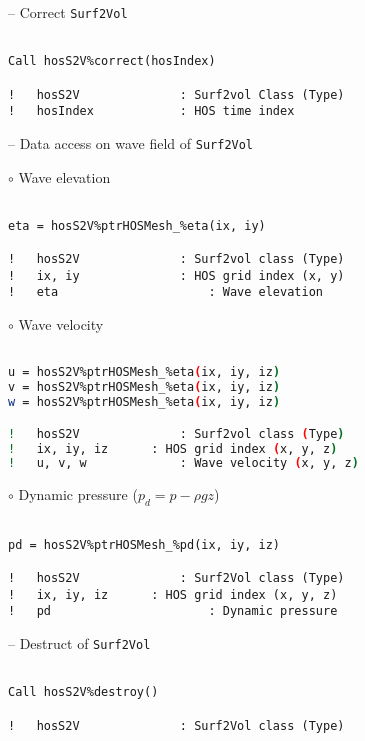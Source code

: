 \vspace{0.5cm}	

\hspace{0.5 cm} -- Correct \texttt{Surf2Vol}

\begin{lstlisting}[language={[95]Fortran}]

Call hosS2V%correct(hosIndex)

!	hosS2V				: Surf2vol Class (Type)
!	hosIndex			: HOS time index
\end{lstlisting}		

\vspace{0.5cm}	

\hspace{0.5 cm} -- Data access on wave field of \texttt{Surf2Vol}

\hspace{1.0 cm} $\circ$ Wave elevation 

\begin{lstlisting}[language={[95]Fortran}]

eta = hosS2V%ptrHOSMesh_%eta(ix, iy)

!	hosS2V				: Surf2vol class (Type)
!	ix, iy				: HOS grid index (x, y)
!	eta						: Wave elevation
\end{lstlisting}	

\hspace{1.0 cm} $\circ$ Wave velocity

\begin{lstlisting}[language=bash]

u = hosS2V%ptrHOSMesh_%eta(ix, iy, iz)
v = hosS2V%ptrHOSMesh_%eta(ix, iy, iz)
w = hosS2V%ptrHOSMesh_%eta(ix, iy, iz)

!	hosS2V				: Surf2vol class (Type)
!	ix, iy, iz		: HOS grid index (x, y, z)
!	u, v, w				: Wave velocity (x, y, z)
\end{lstlisting}	

\pagebreak

\hspace{1.0 cm} $\circ$ Dynamic pressure ($p_d = p - \rho g z$)

\begin{lstlisting}[language={[95]Fortran}]

pd = hosS2V%ptrHOSMesh_%pd(ix, iy, iz)

!	hosS2V				: Surf2Vol class (Type)
!	ix, iy, iz		: HOS grid index (x, y, z)
!	pd						: Dynamic pressure
\end{lstlisting}	

\vspace{0.5cm}	

\hspace{0.5 cm} -- Destruct of \texttt{Surf2Vol}

\begin{lstlisting}[language={[95]Fortran}]

Call hosS2V%destroy()

!	hosS2V				: Surf2Vol class (Type)
\end{lstlisting}


